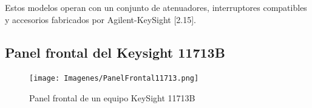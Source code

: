 Estos modelos operan con un conjunto de atenuadores, interruptores compatibles y accesorios fabricados por
Agilent-KeySight [2.15].

\subsection[Panel frontal del Keysight 11713B]{Panel frontal del Keysight 11713B}		

\begin{figure}
	\centering
	\begin{minipage}{17.404cm}
		\texttt{[image: Imagenes/PanelFrontal11713.png]}
		\caption{Panel frontal de un equipo KeySight 11713B}
		\label{Fig:PanelFrontal11713}				
	\end{minipage}
\end{figure}

